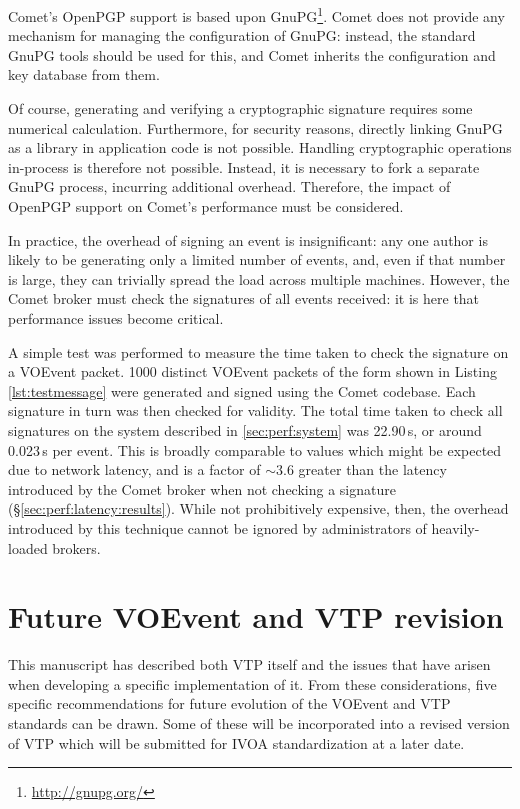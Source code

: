 \documentclass[5p,authoryear]{elsarticle}
\begin{document}
Comet's OpenPGP support is based upon GnuPG\footnote{\url{http://gnupg.org/}}.
Comet does not provide any mechanism for managing the configuration of GnuPG:
instead, the standard GnuPG tools should be used for this, and Comet inherits
the configuration and key database from them.

Of course, generating and verifying a cryptographic signature requires some
numerical calculation. Furthermore, for security reasons, directly linking
GnuPG as a library in application code is not possible. Handling cryptographic
operations in-process is therefore not possible. Instead, it is necessary to
fork a separate GnuPG process, incurring additional overhead. Therefore, the
impact of OpenPGP support on Comet's performance must be considered.

In practice, the overhead of signing an event is insignificant: any one author
is likely to be generating only a limited number of events, and, even if that
number is large, they can trivially spread the load across multiple machines.
However, the Comet broker must check the signatures of all events received: it
is here that performance issues become critical.

A simple test was performed to measure the time taken to check the signature
on a VOEvent packet. 1000 distinct VOEvent packets of the form shown in
Listing \ref{lst:testmessage} were generated and signed using the Comet
codebase. Each signature in turn was then checked for validity. The total
time taken to check all signatures on the system described in
\ref{sec:perf:system} was 22.90\,s, or around 0.023\,s per event. This is
broadly comparable to values which might be expected due to network latency,
and is a factor of $\sim3.6$ greater than the latency introduced by the Comet
broker when not checking a signature (\S\ref{sec:perf:latency:results}). While
not prohibitively expensive, then, the overhead introduced by this technique
cannot be ignored by administrators of heavily-loaded brokers.

\section{Future VOEvent and VTP revision}
\label{sec:future}

This manuscript has described both VTP itself and the issues that have arisen
when developing a specific implementation of it.  From these considerations,
five specific recommendations for future evolution of the VOEvent and VTP
standards can be drawn. Some of these will be incorporated into a revised
version of VTP which will be submitted for IVOA standardization at a later
date.
\end{document}
